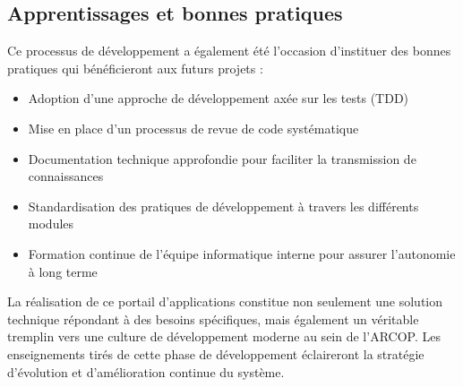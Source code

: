 \subsection{Apprentissages et bonnes pratiques}

Ce processus de développement a également été l'occasion d'instituer des bonnes pratiques qui bénéficieront aux futurs projets :

\begin{itemize}
    \item Adoption d'une approche de développement axée sur les tests (TDD)
    \item Mise en place d'un processus de revue de code systématique
    \item Documentation technique approfondie pour faciliter la transmission de connaissances
    \item Standardisation des pratiques de développement à travers les différents modules
    \item Formation continue de l'équipe informatique interne pour assurer l'autonomie à long terme
\end{itemize}

La réalisation de ce portail d'applications constitue non seulement une solution technique répondant à des besoins spécifiques, mais également un véritable tremplin vers une culture de développement moderne au sein de l'ARCOP. Les enseignements tirés de cette phase de développement éclaireront la stratégie d'évolution et d'amélioration continue du système.
